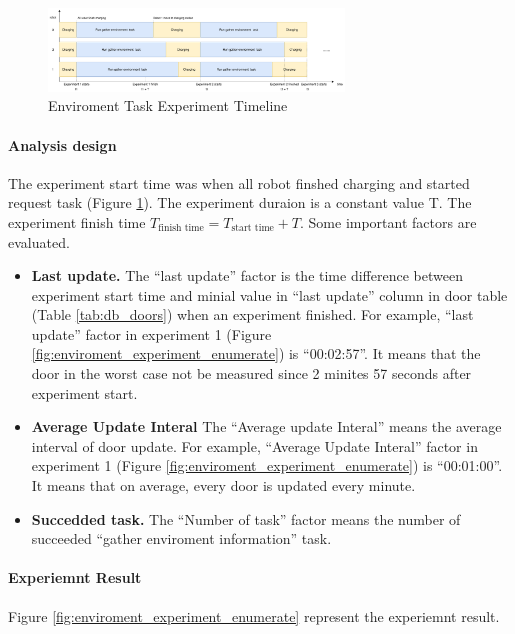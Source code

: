 \begin{figure}[htbp]
    \centering
    \includegraphics[width = 0.7\textwidth]{content/images/ch5/env_exp_timeline.drawio.png}
    \caption{Enviroment Task Experiment Timeline}
    \label{tab:env_exp_timeline}
\end{figure}

\paragraph{Analysis design} The experiment start time was when all robot finshed charging and started request task (Figure \ref{tab:env_exp_timeline}). The experiment duraion is a constant value T. The experiment finish time $T_{\mbox{finish time}} = T_{\mbox{start time}} + T $. Some important factors are evaluated. 

\begin{itemize}
    \item \textbf{Last update.} The ``last update'' factor is the time difference between experiment start time and minial value in ``last update'' column in door table (Table \ref{tab:db_doors}) when an experiment finished. For example, ``last update'' factor in experiment 1 (Figure \ref{fig:enviroment_experiment_enumerate})  is ``00:02:57''. It means that the door in the worst case not be measured since 2 minites 57 seconds after experiment start.
    \item \textbf{Average Update Interal} The ``Average update Interal'' means the average interval of door update. For example, ``Average Update Interal'' factor in experiment 1 (Figure \ref{fig:enviroment_experiment_enumerate}) is ``00:01:00''. It means that on average, every door is updated every minute.
    \item \textbf{Succedded task.} The ``Number of task'' factor  means the number of succeeded ``gather enviroment information'' task.
\end{itemize}

\paragraph{Experiemnt Result} 
Figure \ref{fig:enviroment_experiment_enumerate} represent the experiemnt result.

